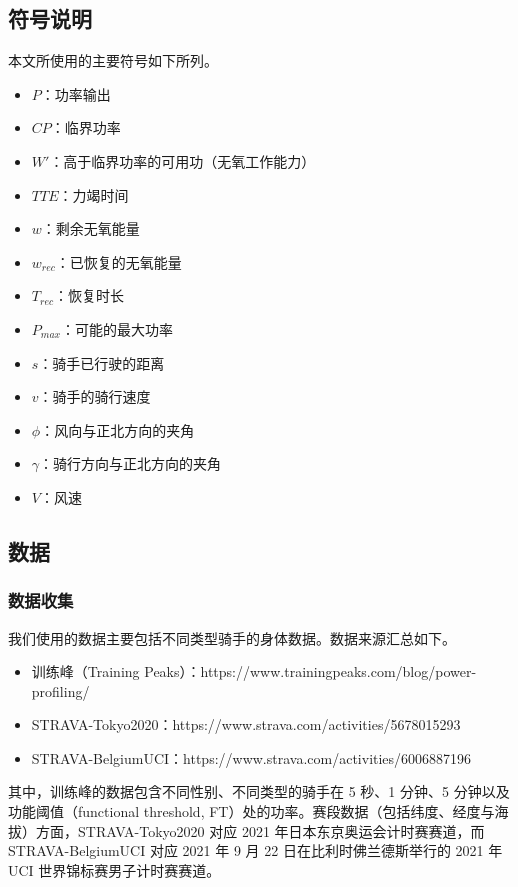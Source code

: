 \documentclass[11pt,a4paper]{ctexart}
\begin{document}
\subsection{符号说明}

本文所使用的主要符号如下所列。

\begin{itemize}
\item $P$：功率输出
\item $CP$：临界功率
\item $W'$：高于临界功率的可用功（无氧工作能力）
\item $TTE$：力竭时间
\item $w$：剩余无氧能量
\item $w_{rec}$：已恢复的无氧能量
\item $T_{rec}$：恢复时长
\item $P_{max}$：可能的最大功率
\item $s$：骑手已行驶的距离
\item $v$：骑手的骑行速度
\item $\phi$：风向与正北方向的夹角
\item $\gamma$：骑行方向与正北方向的夹角
\item $V$：风速
\end{itemize}

\subsection{数据}

\subsubsection{数据收集}

我们使用的数据主要包括不同类型骑手的身体数据。数据来源汇总如下。

\begin{itemize}
\item 训练峰（Training Peaks）：https://www.trainingpeaks.com/blog/power-profiling/
\item STRAVA-Tokyo2020：https://www.strava.com/activities/5678015293
\item STRAVA-BelgiumUCI：https://www.strava.com/activities/6006887196
\end{itemize}

其中，训练峰的数据包含不同性别、不同类型的骑手在 5 秒、1 分钟、5 分钟以及功能阈值（functional threshold, FT）处的功率。赛段数据（包括纬度、经度与海拔）方面，STRAVA-Tokyo2020 对应 2021 年日本东京奥运会计时赛赛道，而 STRAVA-BelgiumUCI 对应 2021 年 9 月 22 日在比利时佛兰德斯举行的 2021 年 UCI 世界锦标赛男子计时赛赛道。
\end{document}
